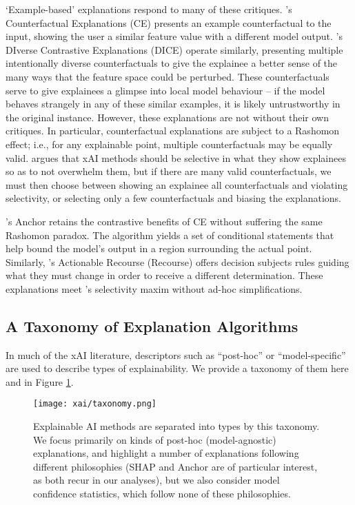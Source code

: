 `Example-based' explanations respond to many of these critiques. \textcite{wachter_counterfactual_2017}'s Counterfactual Explanations (CE) presents an example counterfactual to the input, showing the user a similar feature value with a different model output. \textcite{mothilal_explaining_2019}'s DIverse Contrastive Explanations (DICE) operate similarly, presenting multiple intentionally diverse counterfactuals to give the explainee a better sense of the many ways that the feature space could be perturbed. These counterfactuals serve to give explainees a glimpse into local model behaviour – if the model behaves strangely in any of these similar examples, it is likely untrustworthy in the original instance. However, these explanations are not without their own critiques. In particular, counterfactual explanations are subject to a Rashomon effect; i.e., for any explainable point, multiple counterfactuals may be equally valid. \textcite{miller_explanation_2017} argues that xAI methods should be selective in what they show explainees so as to not overwhelm them, but if there are many valid counterfactuals, we must then choose between showing an explainee all counterfactuals and violating selectivity, or selecting only a few counterfactuals and biasing the explanations.

\textcite{ribeiro_anchors_2018}'s Anchor retains the contrastive benefits of CE without suffering the same Rashomon paradox. The algorithm yields a set of conditional statements that help bound the model's output in a region surrounding the actual point. Similarly, \textcite{ustun_actionable_2019}'s Actionable Recourse (Recourse) offers decision subjects rules guiding what they must change in order to receive a different determination. These explanations meet \textcite{miller_explanation_2017}'s selectivity maxim without ad-hoc simplifications.

\subsection{A Taxonomy of Explanation Algorithms}
In much of the xAI literature, descriptors such as ``post-hoc'' or ``model-specific'' are used to describe types of explainability. We provide a taxonomy of them here and in Figure \ref{fig:taxonomy}.

\begin{figure}[htbp]
    \centering
    \texttt{[image: xai/taxonomy.png]}
    \caption{Explainable AI methods are separated into types by this taxonomy. We focus primarily on kinds of post-hoc (model-agnostic) explanations, and highlight a number of explanations following different philosophies (SHAP and Anchor are of particular interest, as both recur in our analyses), but we also consider model confidence statistics, which follow none of these philosophies.}
    \label{fig:taxonomy}
\end{figure}

